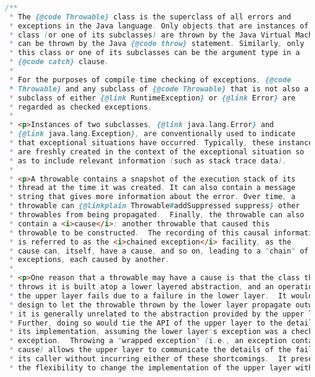 \begin{lstlisting}[language=java]
    
/**
 * The {@code Throwable} class is the superclass of all errors and
 * exceptions in the Java language. Only objects that are instances of this
 * class (or one of its subclasses) are thrown by the Java Virtual Machine or
 * can be thrown by the Java {@code throw} statement. Similarly, only
 * this class or one of its subclasses can be the argument type in a
 * {@code catch} clause.
 *
 * For the purposes of compile-time checking of exceptions, {@code
 * Throwable} and any subclass of {@code Throwable} that is not also a
 * subclass of either {@link RuntimeException} or {@link Error} are
 * regarded as checked exceptions.
 *
 * <p>Instances of two subclasses, {@link java.lang.Error} and
 * {@link java.lang.Exception}, are conventionally used to indicate
 * that exceptional situations have occurred. Typically, these instances
 * are freshly created in the context of the exceptional situation so
 * as to include relevant information (such as stack trace data).
 *
 * <p>A throwable contains a snapshot of the execution stack of its
 * thread at the time it was created. It can also contain a message
 * string that gives more information about the error. Over time, a
 * throwable can {@linkplain Throwable#addSuppressed suppress} other
 * throwables from being propagated.  Finally, the throwable can also
 * contain a <i>cause</i>: another throwable that caused this
 * throwable to be constructed.  The recording of this causal information
 * is referred to as the <i>chained exception</i> facility, as the
 * cause can, itself, have a cause, and so on, leading to a "chain" of
 * exceptions, each caused by another.
 *
 * <p>One reason that a throwable may have a cause is that the class that
 * throws it is built atop a lower layered abstraction, and an operation on
 * the upper layer fails due to a failure in the lower layer.  It would be bad
 * design to let the throwable thrown by the lower layer propagate outward, as
 * it is generally unrelated to the abstraction provided by the upper layer.
 * Further, doing so would tie the API of the upper layer to the details of
 * its implementation, assuming the lower layer's exception was a checked
 * exception.  Throwing a "wrapped exception" (i.e., an exception containing a
 * cause) allows the upper layer to communicate the details of the failure to
 * its caller without incurring either of these shortcomings.  It preserves
 * the flexibility to change the implementation of the upper layer without

\end{lstlisting}
